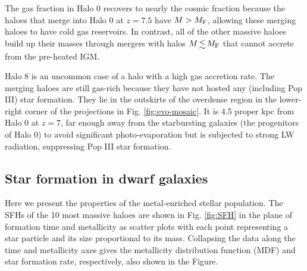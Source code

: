 \documentclass[useAMS,usenatbib]{mn2e}
\begin{document}
The gas fraction in Halo 0 recovers to nearly the cosmic fraction
because the haloes that merge into Halo 0 at $z=7.5$ have $M > M_{\rm
  F}$, allowing these merging haloes to have cold gas reservoirs.  In
contrast, all of the other massive haloes build up their masses
through mergers with halos $M \la M_{\rm F}$ that cannot accrete from
the pre-heated IGM.

Halo 8 is an uncommon case of a halo with a high gas accretion rate.
The merging haloes are still gas-rich because they have not hosted any
(including Pop III) star formation.  They lie in the outskirts of the
overdense region in the lower-right corner of the projections in
Fig. \ref{fig:evo-mosaic}.  It is 4.5 proper kpc from Halo 0 at $z=7$,
far enough away from the starbursting galaxies (the progenitors of
Halo 0) to avoid significant photo-evaporation but is subjected to
strong LW radiation, suppressing Pop III star formation.

\subsection{Star formation in dwarf galaxies}

\begin{figure*}
  \caption{\label{fig:SFH} The scatter plots show the Pop II star
    formation history as a function of time with respect to
    metallicity for the 10 most massive halos.  Halo 8 is not shown
    because it contains no stars.  Each circle represents a star
    particle, whose area is proportional to its mass.  The open
    circles in the upper right represent $M = 10^3$ and $10^4$ \Ms.
    The dashed lines in the Halo 0 panel guide the eye to two stellar
    populations that were formed in two satellite halos, merging at
    $z=7.5$.  The upper histogram shows the star formation rate with
    each bar representing 5 Myr.  The right histogram depicts the Pop
    II metallicity distribution function.}
\end{figure*}

Here we present the properties of the metal-enriched stellar
population.  The SFHs of the 10 most massive haloes are shown in
Fig. \ref{fig:SFH} in the plane of formation time and metallicity as
scatter plots with each point representing a star particle and its
size proportional to its mass.  Collapsing the data along the time and
metallicity axes gives the metallicity distribution function (MDF) and
star formation rate, respectively, also shown in the Figure.
\end{document}
